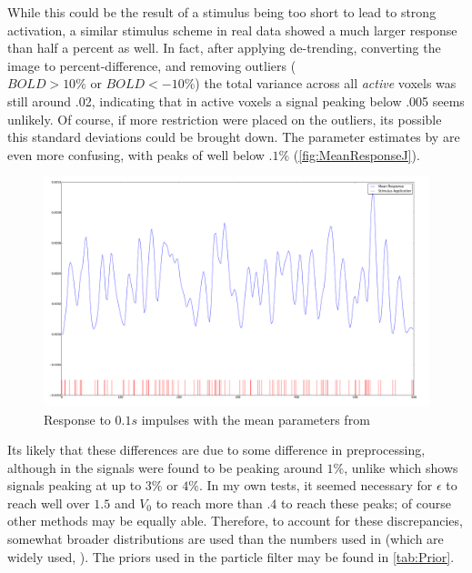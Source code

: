 While this could be the result of a stimulus
being too short to lead to strong activation, a similar stimulus
scheme in real data showed a much larger response than 
half a percent as well. In fact, after applying de-trending,
converting the image to percent-difference, and removing 
outliers ($ BOLD > 10\% \text{ or } BOLD < -10\%$) the total variance
across all \emph{active} voxels was still around .02, indicating
that in active voxels a signal peaking below .005 seems unlikely. 
Of course, if more restriction were placed on the outliers, its possible
this standard deviations could be brought down. 
The parameter estimates by \cite{Johnston2008} are even more 
confusing, with peaks of well below $.1\%$ (\autoref{fig:MeanResponseJ}).

\begin{figure}
\centering
\includegraphics[trim=6cm 3cm 6cm 3cm,width=16cm]{images/mean_response_johnston}
\caption{Response to $0.1s$ impulses with the mean parameters from \cite{Johnston2008}}
\label{fig:MeanResponseJ}
\end{figure}

Its likely that these differences are due to some difference in preprocessing,
although in \cite{Deneux2006} the signals were found to be peaking around
$1\%$, unlike \cite{Friston2000} which shows signals peaking at up to
$3\%$ or $4\%$. In my own tests, it seemed necessary for $\epsilon$ to
reach well over $1.5$ and $V_0$ to reach more than $.4$ to reach these
peaks; of course other methods may be equally able. 
Therefore, to account for these discrepancies, somewhat broader
distributions are used than the numbers used in \cite{Friston2000}
(which are widely used, \cite{Hu2009}). The 
priors used in the particle filter may be found in \autoref{tab:Prior}.

